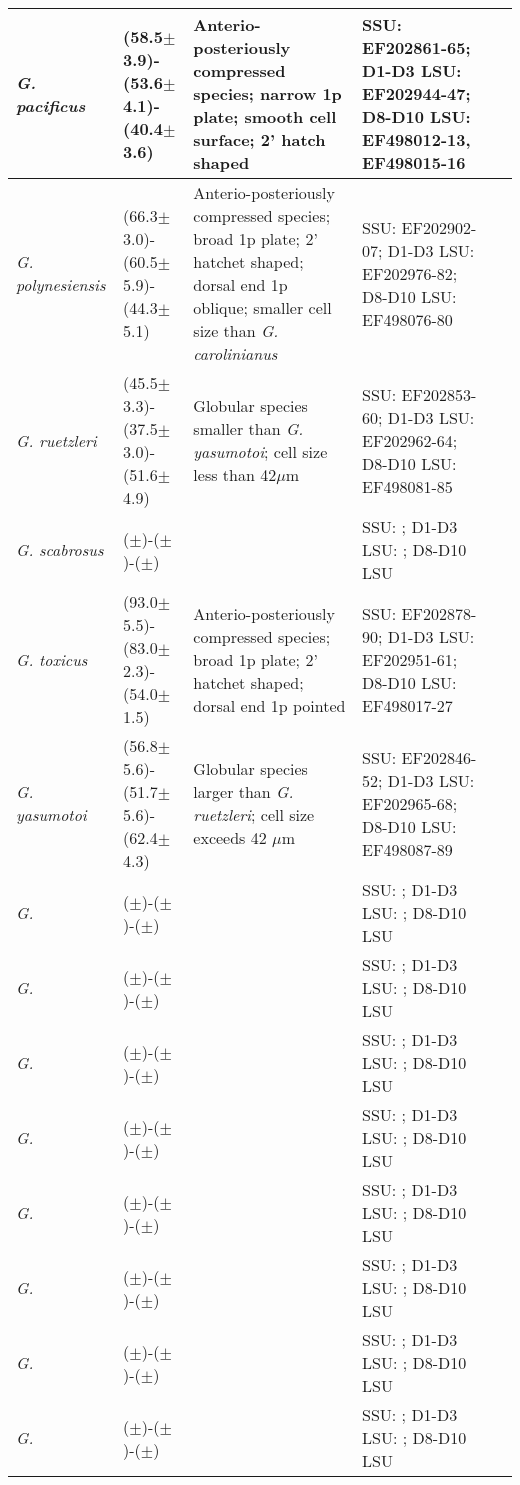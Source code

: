 \documentclass[12pt]{article}
\begin{document}
\begin{longtable}{ |  p{2cm} | p{2.7cm} | p{4cm} | p{3.1cm} | p{2.1cm} | }
\hline
  \emph{G. pacificus} & (58.5$\pm$3.9)-(53.6$\pm$4.1)-(40.4$\pm$3.6) & Anterio-posteriously compressed species; narrow 1p plate; smooth cell surface; 2' hatch shaped & SSU: EF202861-65; D1-D3 LSU: EF202944-47; D8-D10 LSU: EF498012-13, EF498015-16  & \cite{litaker2009taxonomy,chinain1999morphology} \\
\hline
 \emph{G. polynesiensis} & (66.3$\pm$3.0)-(60.5$\pm$5.9)-(44.3$\pm$5.1) & Anterio-posteriously compressed species; broad 1p plate; 2’ hatchet shaped; dorsal end 1p oblique; smaller cell size than \emph{G. carolinianus} & SSU: EF202902-07; D1-D3 LSU: EF202976-82; D8-D10 LSU: EF498076-80  & \cite{litaker2009taxonomy,chinain1999morphology} \\
\hline
 \emph{G. ruetzleri} & (45.5$\pm$3.3)-(37.5$\pm$3.0)-(51.6$\pm$4.9) & Globular species smaller than \emph{G. yasumotoi}; cell size less than 42$\mu$m & SSU: EF202853-60; D1-D3 LSU: EF202962-64; D8-D10 LSU: EF498081-85 & \cite{litaker2009taxonomy} \\
\hline
 \emph{G. scabrosus} & ($\pm$)-($\pm$)-($\pm$) &  & SSU: ; D1-D3 LSU: ; D8-D10 LSU  & \cite{nishimura2013genetic,nishimura2014morphology} \\
\hline
 \emph{G. toxicus} & (93.0$\pm$5.5)-(83.0$\pm$2.3)-(54.0$\pm$1.5) & Anterio-posteriously compressed species; broad 1p plate; 2’ hatchet shaped; dorsal end 1p pointed & SSU: EF202878-90; D1-D3 LSU: EF202951-61; D8-D10 LSU: EF498017-27 & \cite{litaker2009taxonomy,adachi1979thecal,chinain1997intraspecific,richlen2008phylogeography} \\
\hline
  \emph{G. yasumotoi} & (56.8$\pm$5.6)-(51.7$\pm$5.6)-(62.4$\pm$4.3) & Globular species larger than \emph{G. ruetzleri}; cell size exceeds 42 $\mu$m & SSU: EF202846-52; D1-D3 LSU: EF202965-68; D8-D10 LSU: EF498087-89 & \cite{holmes1998gambierdiscus,litaker2009taxonomy} \\
\hline
 \emph{G. } & ($\pm$)-($\pm$)-($\pm$) &  & SSU: ; D1-D3 LSU: ; D8-D10 LSU  & \cite{litaker2009taxonomy} \\
\hline
 \emph{G. } & ($\pm$)-($\pm$)-($\pm$) &  & SSU: ; D1-D3 LSU: ; D8-D10 LSU  & \cite{litaker2009taxonomy} \\
\hline
 \emph{G. } & ($\pm$)-($\pm$)-($\pm$) &  & SSU: ; D1-D3 LSU: ; D8-D10 LSU & \cite{} \\
\hline
 \emph{G. } & ($\pm$)-($\pm$)-($\pm$) &  & SSU: ; D1-D3 LSU: ; D8-D10 LSU  & \cite{} \\
\hline
 \emph{G. } & ($\pm$)-($\pm$)-($\pm$) &  & SSU: ; D1-D3 LSU: ; D8-D10 LSU  & \cite{} \\
\hline
 \emph{G. } & ($\pm$)-($\pm$)-($\pm$) &  & SSU: ; D1-D3 LSU: ; D8-D10 LSU  & \cite{} \\
\hline
 \emph{G. } & ($\pm$)-($\pm$)-($\pm$) &  & SSU: ; D1-D3 LSU: ; D8-D10 LSU  & \cite{} \\
\hline
 \emph{G. } & ($\pm$)-($\pm$)-($\pm$) &  & SSU: ; D1-D3 LSU: ; D8-D10 LSU  & \cite{} \\
\hline
\end{longtable}
\FloatBarrier
\end{document}
